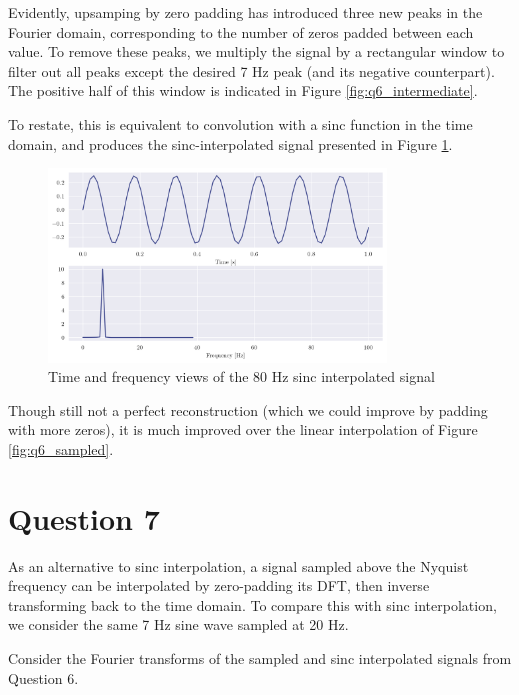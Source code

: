 \documentclass[a4paper, 11pt]{article}
\begin{document}
Evidently, upsamping by zero padding has introduced three new peaks in the
Fourier domain, corresponding to the number of zeros padded between each value.
To remove these peaks, we multiply the signal by a rectangular window to filter
out all peaks except the desired 7 Hz peak (and its negative counterpart). The
positive half of this window is indicated in Figure \ref{fig:q6_intermediate}.

To restate, this is equivalent to convolution with a sinc function in the time
domain, and produces the sinc-interpolated signal presented in Figure
\ref{fig:q6_upsampled}.

\begin{figure}[ht]
    \centering
    \includegraphics[width=0.8\textwidth]{images/q6_upsampled.png}
    \caption{Time and frequency views of the 80 Hz sinc interpolated signal}
    \label{fig:q6_upsampled}
\end{figure}

Though still not a perfect reconstruction (which we could improve by padding
with more zeros), it is much improved over the linear interpolation of Figure
\ref{fig:q6_sampled}.

\newpage
\section*{Question 7}

As an alternative to sinc interpolation, a signal sampled above the Nyquist
frequency can be interpolated by zero-padding its DFT, then inverse transforming
back to the time domain. To compare this with sinc interpolation, we consider
the same 7 Hz sine wave sampled at 20 Hz.

Consider the Fourier transforms of the sampled and sinc interpolated signals
from Question 6.
\end{document}
